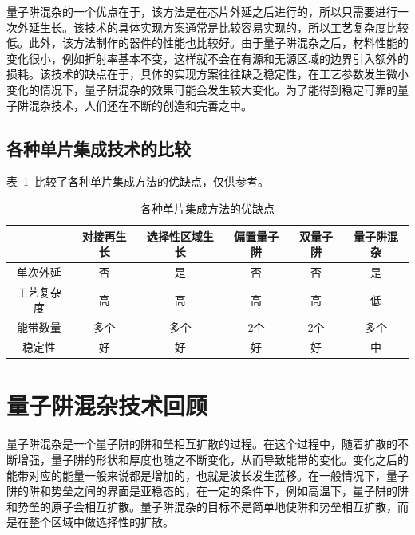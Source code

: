 \documentclass{ZJUthesis}
\begin{document}
量子阱混杂的一个优点在于，该方法是在芯片外延之后进行的，所以只需要进行一次外延生长。该技术的具体实现方案通常是比较容易实现的，所以工艺复杂度比较低。此外，该方法制作的器件的性能也比较好。由于量子阱混杂之后，材料性能的变化很小，例如折射率基本不变，这样就不会在有源和无源区域的边界引入额外的损耗。该技术的缺点在于，具体的实现方案往往缺乏稳定性，在工艺参数发生微小变化的情况下，量子阱混杂的效果可能会发生较大变化。为了能得到稳定可靠的量子阱混杂技术，人们还在不断的创造和完善之中。

\subsection{各种单片集成技术的比较}

表~\ref{integration_compare}~比较了各种单片集成方法的优缺点，仅供参考。
\begin{table}[htbp]
    \caption{各种单片集成方法的优缺点}
    \centering
    \label{integration_compare}
    \begin{tabular}{cccccc}
        \hline
        \hline
                   & 对接再生长 & 选择性区域生长 & 偏置量子阱 & 双量子阱 & 量子阱混杂\\
        \hline
        单次外延    &  否       & 是           & 否        & 否      &是\\
        工艺复杂度   &高        &高             &高        &高       &低\\
        能带数量    &多个       &多个           &2个       &2个       &多个\\
        稳定性      &好        &好             &好        &好        &中\\
        \hline
        \hline
    \end{tabular}
\end{table}

\section{量子阱混杂技术回顾}

量子阱混杂是一个量子阱的阱和垒相互扩散的过程。在这个过程中，随着扩散的不断增强，量子阱的形状和厚度也随之不断变化，从而导致能带的变化。变化之后的能带对应的能量一般来说都是增加的，也就是波长发生蓝移。在一般情况下，量子阱的阱和势垒之间的界面是亚稳态的，在一定的条件下，例如高温下，量子阱的阱和势垒的原子会相互扩散。量子阱混杂的目标不是简单地使阱和势垒相互扩散，而是在整个区域中做选择性的扩散。
\end{document}
